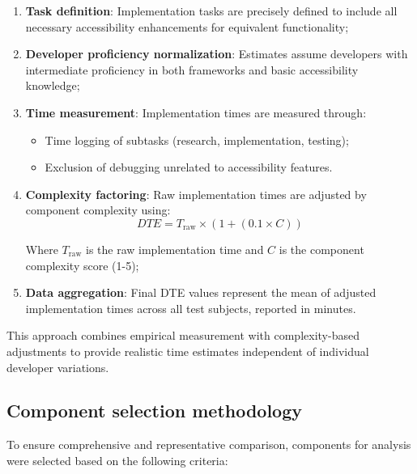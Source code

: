 \begin{enumerate}
    \item \textbf{Task definition}: Implementation tasks are precisely defined to include all necessary accessibility enhancements for equivalent functionality;
    
    \item \textbf{Developer proficiency normalization}: Estimates assume developers with intermediate proficiency in both frameworks and basic accessibility knowledge;
    
    \item \textbf{Time measurement}: Implementation times are measured through:
    \begin{itemize}
        \item Time logging of subtasks (research, implementation, testing);
        \item Exclusion of debugging unrelated to accessibility features.
    \end{itemize}
    
    \item \textbf{Complexity factoring}: Raw implementation times are adjusted by component complexity using:
    \begin{equation}
    DTE = T_{\text{raw}} \times (1 + (0.1 \times C))
    \end{equation}
    
    Where $T_{\text{raw}}$ is the raw implementation time and $C$ is the component complexity score (1-5);
    
    \item \textbf{Data aggregation}: Final DTE values represent the mean of adjusted implementation times across all test subjects, reported in minutes.
\end{enumerate}

This approach combines empirical measurement with complexity-based adjustments to provide realistic time estimates independent of individual developer variations.

\subsection{Component selection methodology}
\label{subsec:component-selection}

To ensure comprehensive and representative comparison, components for analysis were selected based on the following criteria:

